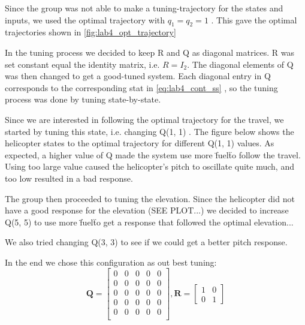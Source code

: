 \documentclass[../main.tex]{subfiles}
\begin{document}
Since the group was not able to make a tuning-trajectory for the states and inputs, we used the optimal trajectory with $q_1 = q_2 = 1$ . This gave the optimal trajectories shown in \cref{fig:lab4_opt_trajectory}


In the tuning process we decided to keep R and Q as diagonal matrices. R was set constant equal the identity matrix, i.e. $R = I_2$. The diagonal elements of Q was then changed to get a good-tuned system. Each diagonal entry in Q corresponds to the corresponding stat in \cref{eq:lab4_cont_ss} , so the tuning process was done by tuning state-by-state. 

Since we are interested in following the optimal trajectory for the travel, we started by tuning this state, i.e. changing Q(1, 1) . The figure below shows the helicopter states to the optimal trajectory for different Q(1, 1) values. As expected, a higher value of Q made the system use more \"fuel\" to follow the travel. Using too large value caused the helicopter's pitch to oscillate quite much, and too low resulted in a bad response.

The group then proceeded to tuning the elevation. Since the helicopter did not have a good response for the elevation (SEE PLOT...) we decided to increase Q(5, 5) to use more \"fuel\" to get a response that followed the optimal elevation...


We also tried changing Q(3, 3) to see if we could get a better pitch response.

In the end we chose this configuration as out best tuning: 
\begin{equation}\label{key}
	\bm Q = \begin{bmatrix}
		0 & 0 & 0 & 0 & 0 \\
		0 & 0 & 0 & 0 & 0 \\
		0 & 0 & 0 & 0 & 0 \\
		0 & 0 & 0 & 0 & 0 \\
		0 & 0 & 0 & 0 & 0 \\
	\end{bmatrix}, 
	\bm R = \begin{bmatrix}
		1 & 0 \\ 
		0 & 1
	\end{bmatrix}
\end{equation}
\end{document}

